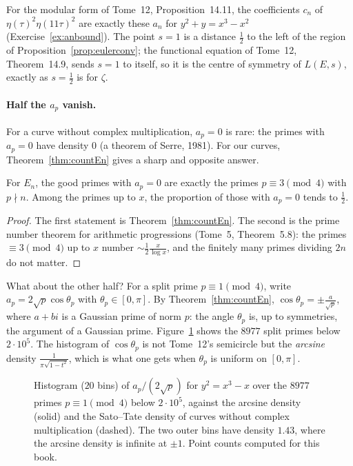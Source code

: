 For the modular form of Tome~12, Proposition~14.11, the coefficients $c_n$ of $\eta(\tau)^2\eta(11\tau)^2$ are exactly these $a_n$ for $y^2+y=x^3-x^2$
(Exercise~\ref{ex:anbound}). The point $s=1$ is a distance $\frac12$ to the left of the region of Proposition~\ref{prop:eulerconv}; the functional equation
of Tome~12, Theorem~14.9, sends $s=1$ to itself, so it is the centre of symmetry of $L(E,s)$, exactly as $s=\frac12$ is for $\zeta$.

\paragraph{Half the $a_p$ vanish.} For a curve without complex multiplication, $a_p=0$ is rare: the primes with $a_p=0$ have density $0$ (a theorem of Serre,
1981). For our curves, Theorem~\ref{thm:countEn} gives a sharp and opposite answer.

\begin{corollary}\label{cor:cmhalf}
For $E_n$, the good primes with $a_p=0$ are exactly the primes $p\equiv3\pmod4$ with $p\nmid n$. Among the primes up to $x$, the proportion of those with
$a_p=0$ tends to $\frac12$.
\end{corollary}
\begin{proof}
The first statement is Theorem~\ref{thm:countEn}. The second is the prime number theorem for arithmetic progressions (Tome~5, Theorem~5.8): the primes
$\equiv3\pmod4$ up to $x$ number $\sim\frac12\frac x{\log x}$, and the finitely many primes dividing $2n$ do not matter.
\end{proof}

What about the other half? For a split prime $p\equiv1\pmod4$, write $a_p=2\sqrt p\cos\theta_p$ with $\theta_p\in[0,\pi]$. By Theorem~\ref{thm:countEn},
$\cos\theta_p=\pm\frac a{\sqrt p}$, where $a+bi$ is a Gaussian prime of norm $p$: the angle $\theta_p$ is, up to symmetries, the argument of a Gaussian prime.
Figure~\ref{fig:cm} shows the $8977$ split primes below $2\cdot10^5$. The histogram of $\cos\theta_p$ is not Tome~12's semicircle but the \emph{arcsine}
density $\frac1{\pi\sqrt{1-t^2}}$, which is what one gets when $\theta_p$ is uniform on $[0,\pi]$.

\begin{figure}[ht]
\centering
{}
\caption{Histogram ($20$ bins) of $a_p/(2\sqrt p)$ for $y^2=x^3-x$ over the $8977$ primes $p\equiv1\pmod4$ below $2\cdot10^5$, against the arcsine density
(solid) and the Sato--Tate density of curves without complex multiplication (dashed). The two outer bins have density $1.43$, where the arcsine density
is infinite at $\pm1$. Point counts computed for this book.}
\label{fig:cm}
\end{figure}

